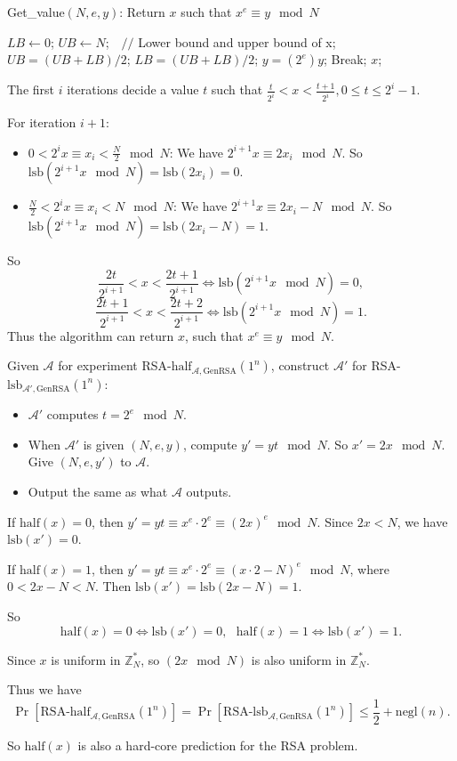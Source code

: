 \documentclass[a4paper]{article}
\newcommand{\negl}{\text{negl}}
\newcommand{\GenRSA}{\text{GenRSA}}
\newcommand{\lsb}{\text{lsb}}
\newcommand{\half}{\text{half}}
\newcommand{\Z}{\mathbb{Z}}
\newcommand{\A}{\mathcal{A}}
\newenvironment{problem}[2][Problem]{\begin{trivlist}
\item[\hskip \labelsep {\bfseries #1}\hskip \labelsep {\bfseries #2.}]}{\end{trivlist}}
\begin{document}
\begin{problem}{11.20}$ $\par
\begin{algorithm}[h] 
\caption{Get\_value$(N,e,y)$: Return $x$ such that $x^e\equiv y\mod N$} 
\begin{algorithmic}[1] 
\State $LB\leftarrow 0$;
\State $UB\leftarrow N$;\ \   $//$ Lower bound and upper bound of x; 
\If {$\A(y)==0$}
\State $UB=(UB+LB)/2$; 
\Else
\State $LB=(UB+LB)/2$;
\EndIf
\State $y=(2^e)y$;
\If {There is only one number $x$ in $[LB,UB)$.}
\State Break;
\EndIf 
\EndFor 
\State \Return $x$; 
\label{code:recentEnd} 
\end{algorithmic} 
\end{algorithm}
The first $i$ iterations decide a value $t$ such that $\frac{t}{2^i}<x<\frac{t+1}{2^i},0\le t\le2^i-1$.\par
For iteration $i+1$:\par
\begin{itemize}
\item $0<2^ix\equiv x_i<\frac N2\mod{N}$: We have $2^{i+1}x\equiv 2x_i\mod N$. So $\lsb(2^{i+1}x\mod N)=\lsb(2x_i)=0$.
\item $\frac N2<2^ix\equiv x_i<N \mod N$: We have $2^{i+1}x\equiv 2x_i-N\mod N$. So $\lsb(2^{i+1}x\mod N)=\lsb(2x_i-N)=1$.
\end{itemize}
So $$\frac{2t}{2^{i+1}}<x<\frac{2t+1}{2^{i+1}}\Leftrightarrow \lsb(2^{i+1}x\mod N)=0,$$
$$\frac{2t+1}{2^{i+1}}<x<\frac{2t+2}{2^{i+1}}\Leftrightarrow \lsb(2^{i+1}x\mod N)=1.$$
Thus the algorithm can return $x$, such that $x^e\equiv y\mod N$.
\end{problem}

\begin{problem}{11.21}
Given $\A$ for experiment RSA-$\half_{\A,\GenRSA}(1^n)$, construct $\A'$ for RSA-$\lsb_{\A',\GenRSA}(1^n)$:
\begin{itemize}
    \item $\A'$ computes $t=2^e\mod N$.
    \item When $\A'$ is given $(N,e,y)$, compute $y'=yt\mod N$. So $x'=2x\mod N$. Give $(N,e,y')$ to $\A$.
    \item Output the same as what $\A$ outputs.
\end{itemize}\par
If $\half(x)=0$, then $y'=yt\equiv x^e\cdot 2^e\equiv(2x)^e\mod N$. Since $2x<N$, we have $\lsb(x')=0$.\par
If $\half(x)=1$, then $y'=yt\equiv x^e\cdot 2^e\equiv(x\cdot 2-N)^e\mod N$, where $0<2x-N<N$. Then $\lsb(x')=\lsb(2x-N)=1$.\par
So $$\half(x)=0\Leftrightarrow \lsb(x')=0,\ \ \ \half(x)=1\Leftrightarrow \lsb(x')=1.$$\par
Since $x$ is uniform in $\Z_N^*$, so $(2x\mod N)$ is also uniform in $\Z_N^*$.\par
Thus we have $$\Pr[\text{RSA-}\half_{\A,\GenRSA}(1^n)]=\Pr[\text{RSA-}\lsb_{\A,\GenRSA}(1^n)]\le \frac12+\negl(n).$$\par
So $\half(x)$ is also a hard-core prediction for the RSA problem.
\end{problem}
\end{document}
